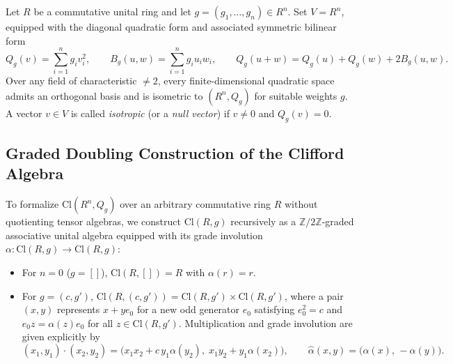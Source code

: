 \documentclass[11pt]{article}
\theoremstyle{definition}
\newcommand{\Cl}{\mathrm{Cl}}
\newcommand{\Z}{\mathbb{Z}}
\begin{document}
Let $R$ be a commutative unital ring and let $g = (g_1, \dots, g_n) \in R^n$. Set
$V = R^n$, equipped with the diagonal quadratic form and associated symmetric bilinear
form
\begin{equation}\label{eq:quad-polar}
  Q_g(v) = \sum_{i=1}^n g_i v_i^2, \qquad
  B_g(u, w) = \sum_{i=1}^n g_i u_i w_i, \qquad
  Q_g(u + w) = Q_g(u) + Q_g(w) + 2 B_g(u, w).
\end{equation}
Over any field of characteristic $\ne 2$, every finite-dimensional quadratic space admits
an orthogonal basis and is isometric to $(R^n, Q_g)$ for suitable weights $g$. A vector
$v \in V$ is called \emph{isotropic} (or a \emph{null vector}) if $v \ne 0$ and
$Q_g(v) = 0$.

\subsection{Graded Doubling Construction of the Clifford Algebra}

To formalize $\Cl(R^n, Q_g)$ over an arbitrary commutative ring $R$ without quotienting
tensor algebras, we construct $\Cl(R, g)$ recursively as a $\Z/2\Z$-graded associative
unital algebra equipped with its grade involution $\alpha : \Cl(R, g) \to \Cl(R, g)$:
\begin{itemize}
  \item For $n = 0$ ($g = []$), $\Cl(R, []) = R$ with $\alpha(r) = r$.
  \item For $g = (c, g')$, $\Cl(R, (c, g')) = \Cl(R, g') \times \Cl(R, g')$, where a pair
    $(x, y)$ represents $x + y e_0$ for a new odd generator $e_0$ satisfying $e_0^2 = c$
    and $e_0 z = \alpha(z) e_0$ for all $z \in \Cl(R, g')$. Multiplication and grade
    involution are given explicitly by
    \begin{equation}\label{eq:cliff-mul}
      (x_1, y_1) \cdot (x_2, y_2) =
      \bigl(x_1 x_2 + c\, y_1 \alpha(y_2),\; x_1 y_2 + y_1 \alpha(x_2)\bigr),
      \qquad
      \hat{\alpha}(x, y) = \bigl(\alpha(x),\, -\alpha(y)\bigr).
    \end{equation}
\end{itemize}
\end{document}
